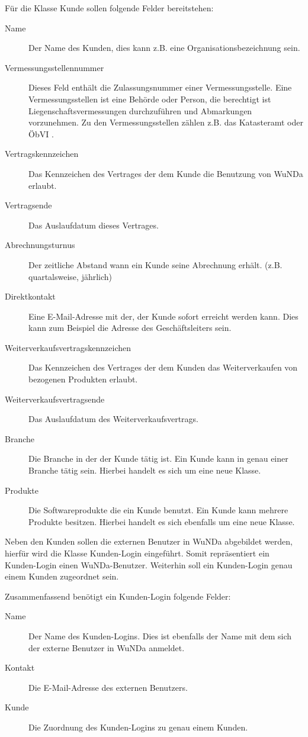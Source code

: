 Für die Klasse Kunde sollen folgende Felder bereitstehen:
\begin{description}
\item[Name] Der Name des Kunden, dies kann z.B. eine Organisationsbezeichnung sein.
\item[Vermessungsstellennummer] Dieses Feld enthält die Zulassungsnummer einer Vermessungsstelle. Eine Vermessungsstellen ist eine Behörde oder Person, die berechtigt ist Liegenschaftsvermessungen durchzuführen und Abmarkungen vorzunehmen. Zu den Vermessungsstellen zählen z.B. das Katasteramt oder ÖbVI \autocite[vgl.][]{recklinghausen-vermessungsstelle}.
\item[Vertragskennzeichen] Das Kennzeichen des Vertrages der dem Kunde die Benutzung von \ac{WuNDa} erlaubt.
\item[Vertragsende] Das Auslaufdatum dieses Vertrages.
\item[Abrechnungsturnus] Der zeitliche Abstand wann ein Kunde seine Abrechnung erhält. (z.B. quartalsweise, jährlich)
\item[Direktkontakt] Eine E-Mail-Adresse mit der, der Kunde sofort erreicht werden kann. Dies kann zum Beispiel die Adresse des Geschäftsleiters sein.
\item[Weiterverkaufsvertragskennzeichen] Das Kennzeichen des Vertrages der dem Kunden das Weiterverkaufen von bezogenen Produkten erlaubt.
\item[Weiterverkaufsvertragsende] Das Auslaufdatum des Weiterverkaufsvertrags.
\item[Branche] Die Branche in der der Kunde tätig ist. Ein Kunde kann in genau einer Branche tätig sein. Hierbei handelt es sich um eine neue Klasse.
\item[Produkte] Die Softwareprodukte die ein Kunde benutzt. Ein Kunde kann mehrere Produkte besitzen. Hierbei handelt es sich ebenfalls um eine neue Klasse.
\end{description}

Neben den Kunden sollen die externen Benutzer in \ac{WuNDa} abgebildet werden, hierfür wird die Klasse Kunden-Login eingeführt.
Somit repräsentiert ein Kunden-Login einen \ac{WuNDa}-Benutzer.
Weiterhin soll ein Kunden-Login genau einem Kunden zugeordnet sein. 

Zusammenfassend benötigt ein Kunden-Login folgende Felder:
\begin{description}
\item[Name] Der Name des Kunden-Logins. Dies ist ebenfalls der Name mit dem sich der externe Benutzer in \ac{WuNDa} anmeldet.
\item[Kontakt] Die E-Mail-Adresse des externen Benutzers.
\item[Kunde] Die Zuordnung des Kunden-Logins zu genau einem Kunden.
\end{description}
